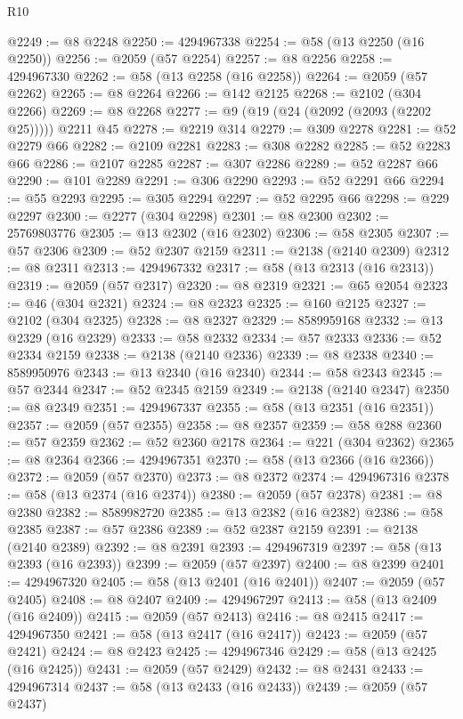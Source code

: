 \begin{lexlean}{R10}
\begin{coremodule}
@2249 := @8 @2248
@2250 := 4294967338
@2254 := @58 (@13 @2250 (@16 @2250))
@2256 := @2059 (@57 @2254)
@2257 := @8 @2256
@2258 := 4294967330
@2262 := @58 (@13 @2258 (@16 @2258))
@2264 := @2059 (@57 @2262)
@2265 := @8 @2264
@2266 := @142 @2125
@2268 := @2102 (@304 @2266)
@2269 := @8 @2268
@2277 := @9 (@19 (@24 (@2092 (@2093 (@2202 @25))))) @2211 @45
@2278 := @2219 @314
@2279 := @309 @2278
@2281 := @52 @2279 @66
@2282 := @2109 @2281
@2283 := @308 @2282
@2285 := @52 @2283 @66
@2286 := @2107 @2285
@2287 := @307 @2286
@2289 := @52 @2287 @66
@2290 := @101 @2289
@2291 := @306 @2290
@2293 := @52 @2291 @66
@2294 := @55 @2293
@2295 := @305 @2294
@2297 := @52 @2295 @66
@2298 := @229 @2297
@2300 := @2277 (@304 @2298)
@2301 := @8 @2300
@2302 := 25769803776
@2305 := @13 @2302 (@16 @2302)
@2306 := @58 @2305
@2307 := @57 @2306
@2309 := @52 @2307 @2159
@2311 := @2138 (@2140 @2309)
@2312 := @8 @2311
@2313 := 4294967332
@2317 := @58 (@13 @2313 (@16 @2313))
@2319 := @2059 (@57 @2317)
@2320 := @8 @2319
@2321 := @65 @2054
@2323 := @46 (@304 @2321)
@2324 := @8 @2323
@2325 := @160 @2125
@2327 := @2102 (@304 @2325)
@2328 := @8 @2327
@2329 := 8589959168
@2332 := @13 @2329 (@16 @2329)
@2333 := @58 @2332
@2334 := @57 @2333
@2336 := @52 @2334 @2159
@2338 := @2138 (@2140 @2336)
@2339 := @8 @2338
@2340 := 8589950976
@2343 := @13 @2340 (@16 @2340)
@2344 := @58 @2343
@2345 := @57 @2344
@2347 := @52 @2345 @2159
@2349 := @2138 (@2140 @2347)
@2350 := @8 @2349
@2351 := 4294967337
@2355 := @58 (@13 @2351 (@16 @2351))
@2357 := @2059 (@57 @2355)
@2358 := @8 @2357
@2359 := @58 @288
@2360 := @57 @2359
@2362 := @52 @2360 @2178
@2364 := @221 (@304 @2362)
@2365 := @8 @2364
@2366 := 4294967351
@2370 := @58 (@13 @2366 (@16 @2366))
@2372 := @2059 (@57 @2370)
@2373 := @8 @2372
@2374 := 4294967316
@2378 := @58 (@13 @2374 (@16 @2374))
@2380 := @2059 (@57 @2378)
@2381 := @8 @2380
@2382 := 8589982720
@2385 := @13 @2382 (@16 @2382)
@2386 := @58 @2385
@2387 := @57 @2386
@2389 := @52 @2387 @2159
@2391 := @2138 (@2140 @2389)
@2392 := @8 @2391
@2393 := 4294967319
@2397 := @58 (@13 @2393 (@16 @2393))
@2399 := @2059 (@57 @2397)
@2400 := @8 @2399
@2401 := 4294967320
@2405 := @58 (@13 @2401 (@16 @2401))
@2407 := @2059 (@57 @2405)
@2408 := @8 @2407
@2409 := 4294967297
@2413 := @58 (@13 @2409 (@16 @2409))
@2415 := @2059 (@57 @2413)
@2416 := @8 @2415
@2417 := 4294967350
@2421 := @58 (@13 @2417 (@16 @2417))
@2423 := @2059 (@57 @2421)
@2424 := @8 @2423
@2425 := 4294967346
@2429 := @58 (@13 @2425 (@16 @2425))
@2431 := @2059 (@57 @2429)
@2432 := @8 @2431
@2433 := 4294967314
@2437 := @58 (@13 @2433 (@16 @2433))
@2439 := @2059 (@57 @2437)

\end{coremodule}
\end{lexlean}
